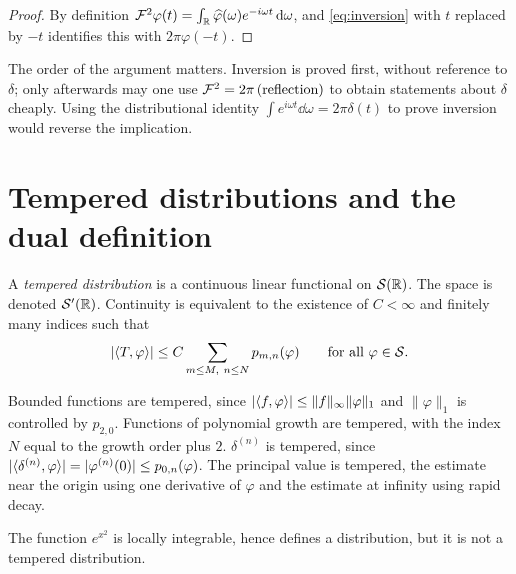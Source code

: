 \begin{proof}
By definition $\mathcal{F}^{2}\varphi(t)=\int_{\mathbb{R}}\widehat{\varphi}(\omega)e^{-i\omega t}\,\mathrm{d}\omega$, and
\eqref{eq:inversion} with $t$ replaced by $-t$ identifies this with $2\pi\varphi(-t)$.
\end{proof}

\begin{remark}
The order of the argument matters. Inversion is proved first, without reference to $\delta$; only
afterwards may one use $\mathcal{F}^{2}=2\pi\,(\text{reflection})$ to obtain statements about $\delta$ cheaply.
Using the distributional identity $\int e^{i\omega t}\dd\omega=2\pi\delta(t)$ to prove inversion would
reverse the implication.
\end{remark}

\section{Tempered distributions and the dual definition}

\begin{definition}\label{def:Sprime}
A \emph{tempered distribution} is a continuous linear functional on $\mathcal{S}(\mathbb{R})$. The space is denoted
$\mathcal{S}'(\mathbb{R})$. Continuity is equivalent to the existence of $C<\infty$ and finitely many indices such
that
\begin{equation}
|\langle T,\varphi\rangle|\le C\sum_{m\le M,\ n\le N}p_{m,n}(\varphi)
\qquad\text{for all }\varphi\in\mathcal{S} .
\label{eq:Sprime-est}
\end{equation}
\end{definition}

\begin{example}\label{ex:tempered}
Bounded functions are tempered, since $|\langle f,\varphi\rangle|\le\|f\|_{\infty}\|\varphi\|_{1}$ and
$\|\varphi\|_{1}$ is controlled by $p_{2,0}$. Functions of polynomial growth are tempered, with the
index $N$ equal to the growth order plus $2$. $\delta^{(n)}$ is tempered, since
$|\langle \delta^{(n)},\varphi\rangle|=|\varphi^{(n)}(0)|\le p_{0,n}(\varphi)$. The principal value is
tempered, the estimate near the origin using one derivative of $\varphi$ and the estimate at
infinity using rapid decay.
\end{example}

\begin{proposition}\label{prop:ex2}
The function $e^{x^{2}}$ is locally integrable, hence defines a distribution, but it is not a
tempered distribution.
\end{proposition}


